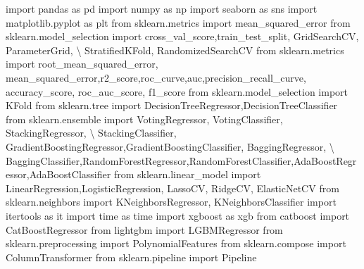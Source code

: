 \documentclass[
  letterpaper,
  DIV=11,
  numbers=noendperiod]{scrreprt}
\newenvironment{Shaded}{\begin{snugshade}}{\end{snugshade}}
\newcommand{\ImportTok}[1]{\textcolor[rgb]{0.00,0.46,0.62}{#1}}
\newcommand{\NormalTok}[1]{\textcolor[rgb]{0.00,0.23,0.31}{#1}}
\newcommand{\OperatorTok}[1]{\textcolor[rgb]{0.37,0.37,0.37}{#1}}
\begin{document}
\begin{Shaded}
\begin{Highlighting}[]
\ImportTok{import}\NormalTok{ pandas }\ImportTok{as}\NormalTok{ pd}
\ImportTok{import}\NormalTok{ numpy }\ImportTok{as}\NormalTok{ np}
\ImportTok{import}\NormalTok{ seaborn }\ImportTok{as}\NormalTok{ sns}
\ImportTok{import}\NormalTok{ matplotlib.pyplot }\ImportTok{as}\NormalTok{ plt}
\ImportTok{from}\NormalTok{ sklearn.metrics }\ImportTok{import}\NormalTok{ mean\_squared\_error}
\ImportTok{from}\NormalTok{ sklearn.model\_selection }\ImportTok{import}\NormalTok{ cross\_val\_score,train\_test\_split, GridSearchCV, ParameterGrid, }\OperatorTok{\textbackslash{}}
\NormalTok{StratifiedKFold, RandomizedSearchCV}
\ImportTok{from}\NormalTok{ sklearn.metrics }\ImportTok{import}\NormalTok{ root\_mean\_squared\_error, mean\_squared\_error,r2\_score,roc\_curve,auc,precision\_recall\_curve, accuracy\_score, roc\_auc\_score, f1\_score}
\ImportTok{from}\NormalTok{ sklearn.model\_selection }\ImportTok{import}\NormalTok{ KFold}
\ImportTok{from}\NormalTok{ sklearn.tree }\ImportTok{import}\NormalTok{ DecisionTreeRegressor,DecisionTreeClassifier}
\ImportTok{from}\NormalTok{ sklearn.ensemble }\ImportTok{import}\NormalTok{ VotingRegressor, VotingClassifier, StackingRegressor, }\OperatorTok{\textbackslash{}}
\NormalTok{StackingClassifier, GradientBoostingRegressor,GradientBoostingClassifier, BaggingRegressor, }\OperatorTok{\textbackslash{}}
\NormalTok{BaggingClassifier,RandomForestRegressor,RandomForestClassifier,AdaBoostRegressor,AdaBoostClassifier}
\ImportTok{from}\NormalTok{ sklearn.linear\_model }\ImportTok{import}\NormalTok{ LinearRegression,LogisticRegression, LassoCV, RidgeCV, ElasticNetCV}
\ImportTok{from}\NormalTok{ sklearn.neighbors }\ImportTok{import}\NormalTok{ KNeighborsRegressor, KNeighborsClassifier}
\ImportTok{import}\NormalTok{ itertools }\ImportTok{as}\NormalTok{ it}
\ImportTok{import}\NormalTok{ time }\ImportTok{as}\NormalTok{ time}
\ImportTok{import}\NormalTok{ xgboost }\ImportTok{as}\NormalTok{ xgb}
\ImportTok{from}\NormalTok{ catboost }\ImportTok{import}\NormalTok{ CatBoostRegressor}
\ImportTok{from}\NormalTok{ lightgbm }\ImportTok{import}\NormalTok{ LGBMRegressor}
\ImportTok{from}\NormalTok{ sklearn.preprocessing }\ImportTok{import}\NormalTok{ PolynomialFeatures}
\ImportTok{from}\NormalTok{ sklearn.compose }\ImportTok{import}\NormalTok{ ColumnTransformer}
\ImportTok{from}\NormalTok{ sklearn.pipeline }\ImportTok{import}\NormalTok{ Pipeline}
\end{Highlighting}
\end{Shaded}
\end{document}
